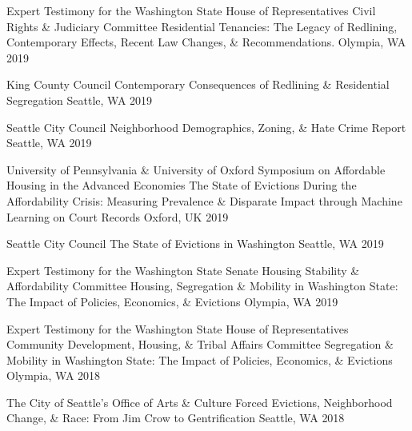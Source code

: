 \begin{cventries}
  \cventry
    {Expert Testimony for the Washington State House of Representatives Civil Rights \& Judiciary Committee} %
    {Residential Tenancies: The Legacy of Redlining, Contemporary Effects, Recent Law Changes, \& Recommendations.} %
    {Olympia, WA} %
    {2019} %
    {}

  \cventry
    {King County Council} %
    {Contemporary Consequences of Redlining \& Residential Segregation} %
    {Seattle, WA} %
    {2019} %
    {}

  \cventry
    {Seattle City Council} %
    {Neighborhood Demographics, Zoning, \& Hate Crime Report} %
    {Seattle, WA} %
    {2019} %
    {}

  \cventry
    {University of Pennsylvania \& University of Oxford Symposium on Affordable Housing in the Advanced Economies} %
    {The State of Evictions During the Affordability Crisis: Measuring Prevalence \& Disparate Impact through Machine Learning on Court Records} %
    {Oxford, UK} %
    {2019} %
    {}

  \cventry
    {Seattle City Council} %
    {The State of Evictions in Washington} %
    {Seattle, WA} %
    {2019} %
    {}

  \cventry
    {Expert Testimony for the Washington State Senate Housing Stability \& Affordability Committee} %
    {Housing, Segregation \& Mobility in Washington State: The Impact of Policies, Economics, \& Evictions} %
    {Olympia, WA} %
    {2019} %
    {}

  \cventry
    {Expert Testimony for the Washington State House of Representatives Community Development, Housing, \& Tribal Affairs Committee} %
    {Segregation \& Mobility in Washington State: The Impact of Policies, Economics, \& Evictions} %
    {Olympia, WA} %
    {2018} %
    {}

  \cventry
    {The City of Seattle’s Office of Arts \& Culture} %
    {Forced Evictions, Neighborhood Change, \& Race: From Jim Crow to Gentrification} %
    {Seattle, WA} %
    {2018} %
    {}


\end{cventries}
